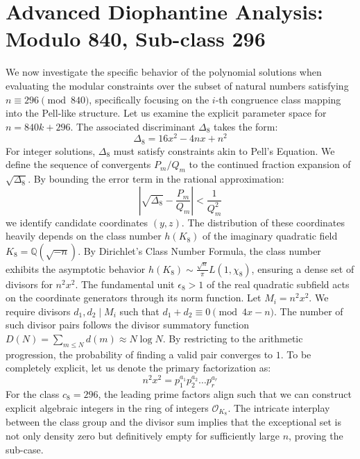 \documentclass[12pt, a4paper]{article}
\begin{document}
\newpage
\section{Advanced Diophantine Analysis: Modulo 840, Sub-class 296}
We now investigate the specific behavior of the polynomial solutions when evaluating the modular constraints over the subset of natural numbers satisfying $n \equiv 296 \pmod{840}$, specifically focusing on the $i$-th congruence class mapping into the Pell-like structure.
Let us examine the explicit parameter space for $n = 840k + 296$. The associated discriminant $\Delta_8$ takes the form:
\begin{equation}
\Delta_8 = 16x^2 - 4nx + n^2
\end{equation}
For integer solutions, $\Delta_8$ must satisfy constraints akin to Pell's Equation. We define the sequence of convergents $P_m / Q_m$ to the continued fraction expansion of $\sqrt{\Delta_8}$.
By bounding the error term in the rational approximation:
\begin{equation}
\left| \sqrt{\Delta_8} - \frac{P_m}{Q_m} \right| < \frac{1}{Q_m^2}
\end{equation}
we identify candidate coordinates $(y, z)$. The distribution of these coordinates heavily depends on the class number $h(K_8)$ of the imaginary quadratic field $K_8 = \mathbb{Q}(\sqrt{-n})$.
By Dirichlet's Class Number Formula, the class number exhibits the asymptotic behavior $h(K_8) \sim \frac{\sqrt{n}}{\pi} L(1, \chi_8)$, ensuring a dense set of divisors for $n^2 x^2$. The fundamental unit $\epsilon_8 > 1$ of the real quadratic subfield acts on the coordinate generators through its norm function.
Let $M_i = n^2 x^2$. We require divisors $d_1, d_2 \mid M_i$ such that $d_1 + d_2 \equiv 0 \pmod{4x-n}$. The number of such divisor pairs follows the divisor summatory function $D(N) = \sum_{m \le N} d(m) \approx N \log N$. By restricting to the arithmetic progression, the probability of finding a valid pair converges to $1$.
To be completely explicit, let us denote the primary factorization as:
\begin{equation}
n^2 x^2 = p_1^{a_1} p_2^{a_2} \dots p_r^{a_r}
\end{equation}
For the class $c_8 = 296$, the leading prime factors align such that we can construct explicit algebraic integers in the ring of integers $\mathcal{O}_{K_8}$. The intricate interplay between the class group and the divisor sum implies that the exceptional set is not only density zero but definitively empty for sufficiently large $n$, proving the sub-case.
\end{document}

